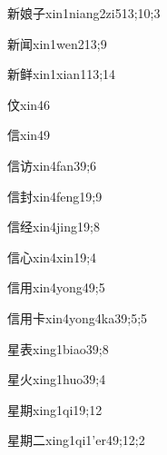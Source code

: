 \begin{verbete}{新娘子}{xin1niang2zi5}{13;10;3}
\end{verbete}
\begin{verbete}{新闻}{xin1wen2}{13;9}
\end{verbete}
\begin{verbete}{新鲜}{xin1xian1}{13;14}
\end{verbete}
\begin{verbete}{伩}{xin4}{6}
\end{verbete}
\begin{verbete}{信}{xin4}{9}
\end{verbete}
\begin{verbete}{信访}{xin4fan3}{9;6}
\end{verbete}
\begin{verbete}{信封}{xin4feng1}{9;9}
\end{verbete}
\begin{verbete}{信经}{xin4jing1}{9;8}
\end{verbete}
\begin{verbete}{信心}{xin4xin1}{9;4}
\end{verbete}
\begin{verbete}{信用}{xin4yong4}{9;5}
\end{verbete}
\begin{verbete}{信用卡}{xin4yong4ka3}{9;5;5}
\end{verbete}
\begin{verbete}{星表}{xing1biao3}{9;8}
\end{verbete}
\begin{verbete}{星火}{xing1huo3}{9;4}
\end{verbete}
\begin{verbete}{星期}{xing1qi1}{9;12}
\end{verbete}
\begin{verbete}{星期二}{xing1qi1'er4}{9;12;2}
\end{verbete}
